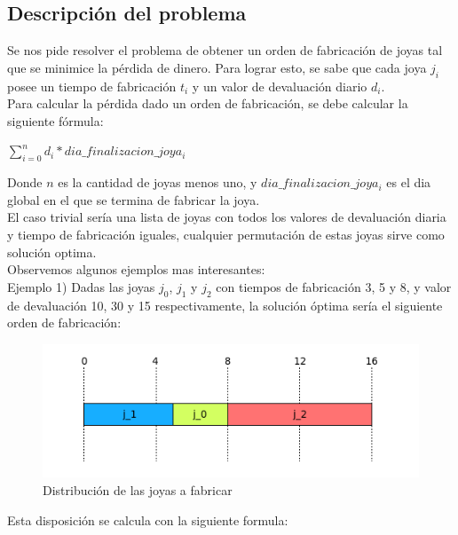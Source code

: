 \subsection{Descripci\'on del problema}

Se nos pide resolver el problema de obtener un orden de fabricaci\'on de joyas tal que se minimice la p\'erdida de dinero. Para lograr esto, se sabe que cada joya $j_{i}$ posee un tiempo de fabricaci\'on $t_{i}$ y un valor de devaluaci\'on diario $d_{i}$. \\

Para calcular la p\'erdida dado un orden de fabricaci\'on, se debe calcular la siguiente f\'ormula:

$\sum\limits_{i=0}^n d_{i}*dia\_finalizacion\_joya_{i}$

Donde $n$ es la cantidad de joyas menos uno, y $dia\_finalizacion\_joya_{i}$ es el dia global en el que se termina de fabricar la joya.\\

El caso trivial ser\'ia una lista de joyas con todos los valores de devaluaci\'on diaria y tiempo de fabricaci\'on iguales, cualquier permutaci\'on de estas joyas sirve como soluci\'on optima. \\ 

Observemos algunos ejemplos mas interesantes: \\

Ejemplo 1) Dadas las joyas $j_{0}$, $j_{1}$ y $j_{2}$ con tiempos de fabricaci\'on 3, 5 y 8, y valor de devaluaci\'on 10, 30 y 15 respectivamente, la soluci\'on \'optima ser\'ia el siguiente orden de fabricaci\'on:

\begin{figure}[h]
\begin{center}
\includegraphics[scale=0.7]{./img/ej2_chart1.png}
\caption{Distribuci\'on de las joyas a fabricar}
\end{center}
\end{figure}

Esta disposici\'on se calcula con la siguiente formula:

